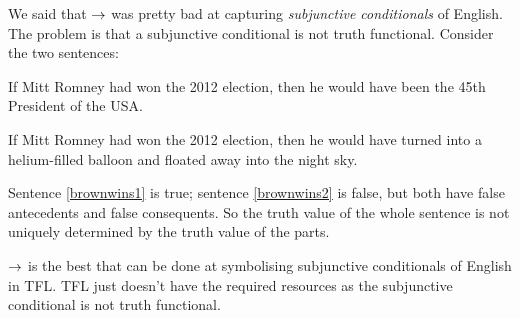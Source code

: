 We said that $\rightarrow$ was pretty bad at capturing \emph{subjunctive conditionals} of English. The problem is that a subjunctive conditional is not truth functional. 
Consider the two sentences:
	\begin{earg}
		\item[\ex{brownwins1}] If Mitt Romney had won the 2012 election, then he would have been the 45th President of the USA.
		\item[\ex{brownwins2}] If Mitt Romney had won the 2012 election, then he would have turned into a helium-filled balloon and floated away into the night sky.
	\end{earg}
Sentence \ref{brownwins1} is true; sentence \ref{brownwins2} is false, but both have false antecedents and false consequents. So the truth value of the whole sentence is not uniquely determined by the truth value of the parts. 

$\rightarrow$ is the best that can be done at symbolising subjunctive conditionals of English in TFL. TFL just doesn't have the required resources as the subjunctive conditional is not truth functional. 


%
%
%
%

